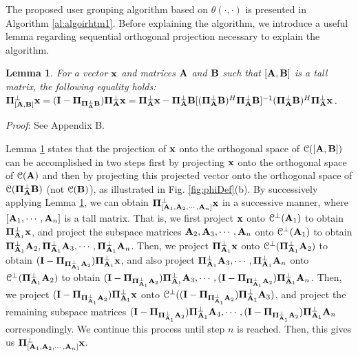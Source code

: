\documentclass[11pt, draft, onecolumn ]{IEEEtran}
\newtheorem{lemma}{Lemma}
\begin{document}
The proposed user grouping algorithm based on $\theta(\cdot,\cdot)$  is presented in Algorithm \ref{al:algoirhtm1}. Before explaining the algorithm, we introduce a useful lemma regarding sequential orthogonal projection necessary to explain the algorithm.

\begin{lemma} \label{lemma:sop}
        For a vector ${\bf x}$ and matrices ${\bf A}$ and ${\bf B}$ such that $[{\bf A},{\bf B}]$ is a tall matrix, the following equality holds:
            ${\bf \Pi}^\bot_{[{\bf A},{\bf B}]} {\bf x} =  ({\bf I}-{\bf \Pi}_{{\bf \Pi}_{\bf A}^\perp {\bf B}}){\bf \Pi}_{\bf A}^\perp {\bf x} = {\bf \Pi}^\bot_{\bf A} {\bf x}
            - {\bf \Pi}^\bot_{{\bf A}} {\bf B} [({\bf \Pi}^\bot_{{\bf A}} {\bf B})^H  {\bf \Pi}^\bot_{{\bf A}} {\bf B} ]^{-1}({\bf \Pi}^\bot_{{\bf A}} {\bf B})^H  {\bf \Pi}^\bot_{\bf A} {\bf x}$.
\end{lemma}

{\em Proof}: See Appendix B.


Lemma  \ref{lemma:sop} states that the projection of ${\bf x}$ onto the orthogonal space of ${\cal C}([{\bf A},{\bf B}])$ can be accomplished in two steps first by projecting ${\bf x}$ onto the orthogonal space of ${\cal C}({\bf A})$  and then by projecting this projected vector onto the orthogonal space of ${\cal C}({\bf \Pi}_{\bf A}^\perp {\bf B})$ (not ${\cal C}({\bf B})$), as illustrated in Fig. \ref{fig:phiDef}(b).   By successively applying Lemma  \ref{lemma:sop}, we can obtain ${\bf \Pi}^\bot_{[{\bf A}_1,{\bf A}_2,\cdots,{\bf A}_n]} {\bf x}$ in a successive manner, where $[{\bf A}_1,\cdots,{\bf A}_n]$ is a tall matrix. That is, we first project ${\bf x}$ onto ${\cal C}^\perp({\bf A}_1)$ to obtain ${\bf \Pi}_{{\bf A}_1}^\perp{\bf x}$, and project the subspace matrices ${\bf A}_2,{\bf A}_3,\cdots,{\bf A}_n$ onto ${\cal C}^\perp({\bf A}_1)$ to obtain ${\bf \Pi}_{{\bf A}_1}^\perp {\bf A}_2, {\bf \Pi}_{{\bf A}_1}^\perp {\bf A}_3, \cdots, {\bf \Pi}_{{\bf A}_1}^\perp {\bf A}_n$. Then, we project  ${\bf \Pi}_{{\bf A}_1}^\perp{\bf x}$ onto ${\cal C}^\perp({\bf \Pi}_{{\bf A}_1}^\perp {\bf A}_2)$ to obtain $({\bf I} - {\bf \Pi}_{{\bf \Pi}_{{\bf A}_1}^\perp {\bf A}_2}){\bf \Pi}_{{\bf A}_1}^\perp{\bf x} $, and also project ${\bf \Pi}_{{\bf A}_1}^\perp {\bf A}_3, \cdots, {\bf \Pi}_{{\bf A}_1}^\perp {\bf A}_n$ onto ${\cal C}^\perp({\bf \Pi}_{{\bf A}_1}^\perp {\bf A}_2)$ to obtain $({\bf I} - {\bf \Pi}_{{\bf \Pi}_{{\bf A}_1}^\perp {\bf A}_2}){\bf \Pi}_{{\bf A}_1}^\perp {\bf A}_3, \cdots, ({\bf I} - {\bf \Pi}_{{\bf \Pi}_{{\bf A}_1}^\perp {\bf A}_2}){\bf \Pi}_{{\bf A}_1}^\perp {\bf A}_n$. Then, we project $({\bf I} - {\bf \Pi}_{{\bf \Pi}_{{\bf A}_1}^\perp {\bf A}_2}){\bf \Pi}_{{\bf A}_1}^\perp{\bf x} $ onto ${\cal C}^\perp(({\bf I} - {\bf \Pi}_{{\bf \Pi}_{{\bf A}_1}^\perp {\bf A}_2}){\bf \Pi}_{{\bf A}_1}^\perp {\bf A}_3)$, and project the remaining  subspace matrices  $({\bf I} - {\bf \Pi}_{{\bf \Pi}_{{\bf A}_1}^\perp {\bf A}_2}){\bf \Pi}_{{\bf A}_1}^\perp {\bf A}_4, \cdots, ({\bf I} - {\bf \Pi}_{{\bf \Pi}_{{\bf A}_1}^\perp {\bf A}_2}){\bf \Pi}_{{\bf A}_1}^\perp {\bf A}_n$ correspondingly. We continue this process until step $n$ is reached. Then, this gives us ${\bf \Pi}^\bot_{[{\bf A}_1,{\bf A}_2,\cdots,{\bf A}_n]} {\bf x}$.
\end{document}
